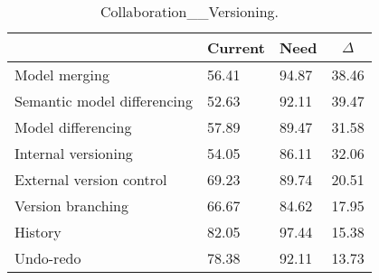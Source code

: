 
  \begin{table*}[]
  \centering
  \notsotiny
  \caption{ Collaboration__Versioning.}
\label{tab:collaboration__versioning}
\begin{tabular}{|l|l|l|l|}
  \hline
  \rowcolor[HTML]{C0C0C0}
    \multicolumn{1}{|c|}{Feature} & \multicolumn{1}{c|}{Current} & \multicolumn{1}{c|}{Need} & \multicolumn{1}{c|}{$\Delta$} \\ \hline
  Model merging & 56.41 & 94.87 & 38.46 \\ \hline 
Semantic model differencing & 52.63 & 92.11 & 39.47 \\ \hline 
Model differencing & 57.89 & 89.47 & 31.58 \\ \hline 
Internal versioning & 54.05 & 86.11 & 32.06 \\ \hline 
External version control & 69.23 & 89.74 & 20.51 \\ \hline 
Version branching & 66.67 & 84.62 & 17.95 \\ \hline 
History & 82.05 & 97.44 & 15.38 \\ \hline 
Undo-redo & 78.38 & 92.11 & 13.73 \\ \hline 
\end{tabular}%
  \end{table*}